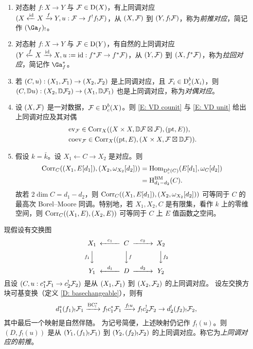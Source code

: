 \begin{ex}
\label{Ex:examples of correspondences}
\begin{enumerate}
\item 对态射 $f: X\to Y$ 与 ${\mathcal F} \in \operatorname{D}(X)$，有上同调对应 $(X\xleftarrow{{\operatorname{id}}}X\xrightarrow{f} Y, u:{\mathcal F}\to f^!f_!{\mathcal F})$，从 $(X,{\mathcal F})$ 到 $(Y,f_!{\mathcal F})$，称为\emph{前推对应}，简记作 $(\Ga_f)_!$。

\item 对态射 $f: X\to Y$ 与 ${\mathcal F} \in \operatorname{D}(Y)$，有自然的上同调对应 $(Y\xleftarrow{f} X\xrightarrow{{\operatorname{id}}} X, u:= \mathrm{id}:f^*{\mathcal F}\to f^*{\mathcal F})$，从 $(Y,{\mathcal F})$ 到 $(X,f^*{\mathcal F})$，称为\emph{拉回对应}，简记作 $\Ga_f^*$。

\item 若 $(C,u): (X_1,{\mathcal F}_1)\to (X_2,{\mathcal F}_2)$ 是上同调对应，且 ${\mathcal F}_i\in \operatorname{D}_c^b(X_i)$，则 $(C,{\mathbb D} u): (X_2, {\mathbb D} {\mathcal F}_2)\to (X_1,{\mathbb D} {\mathcal F}_1)$ 也是上同调对应，称为\emph{对偶对应}。

\item 设 $(X,{\mathcal F})$ 是一对数据，${\mathcal F}\in \operatorname{D}_c^b(X)$。则 \eqref{E: VD counit} 与 \eqref{E: VD unit} 给出上同调对应及其对偶
\[\begin{aligned}
&\operatorname{ev}_{\mathcal F}\in \operatorname{Corr}_{X}((X\times X, {\mathbb D}{\mathcal F}\boxtimes {\mathcal F}),(\operatorname{pt}, E)),\\
&\operatorname{coev}_{\mathcal F}\in \operatorname{Corr}_{X}((\operatorname{pt}, E), (X\times X, {\mathcal F}\boxtimes{\mathbb D}{\mathcal F})).
\end{aligned}\]

\item 假设 $k=\bar k$。设 $X_1\leftarrow C\to X_2$ 是对应。则
\begin{equation*}
\label{E:corr and cycle}
\begin{split}
\operatorname{Corr}_C((X_1,E[d_1]), (X_2, \omega_{X_2}[d_2]))&={\operatorname{Hom}}_{\operatorname{D}^b_c(C)}(E[d_1],\omega_C[d_2])\\
&=\operatorname{H}^{\operatorname{BM}}_{d_1-d_2}(C).
\end{split}
\end{equation*}
故若 $2\dim C=d_1-d_2$，则 $\operatorname{Corr}_C((X_1,E[d_1]), (X_2, \omega_{X_2}[d_2]))$ 可等同于 $C$ 的最高次 Borel–Moore 同调。特别地，若 $X_1,X_2,C$ 是有限集，看作 $k$ 上的零维空间，则 $\operatorname{Corr}_C((X_1,E),(X_2,E))$ 可等同于 $C$ 上 $E$ 值函数之空间。
\end{enumerate}
\end{ex}

现假设有交换图
\[\begin{CD}
X_1@<c_1<< C@>c_2>> X_2\\
@Vf_1VV@VVfV@VVf_2V\\
Y_1@<d_1<<D@>d_2>>Y_2
\end{CD}\]
且设 $(C, u:c_1^*{\mathcal F}_1\to c_2^!{\mathcal F}_2)$ 是从 $(X_1,{\mathcal F}_1)$ 到 $(X_2,{\mathcal F}_2)$ 的上同调对应。
设左交换方块可基变换（定义 \ref{D: basechangeable}），则有
\begin{equation}
\label{ASS:pushforward correspondence}
d_1^*(f_1)_!{\mathcal F}_1\xrightarrow{\operatorname{BC}^*_!} f_!c_1^*{\mathcal F}_1\xrightarrow{f_!u} f_!c_2^!{\mathcal F}_2\to d_2^!(f_2)_!{\mathcal F}_2,
\end{equation}
其中最后一个映射是自然伴随。
为记号简便，上述映射仍记作 $f_!(u)$。则 $(D,f_!(u))$ 是从 $(Y_1,(f_1)_!{\mathcal F}_1)$ 到 $(Y_2,(f_2)_!{\mathcal F}_2)$ 的上同调对应。称它为\emph{上同调对应的前推}。

